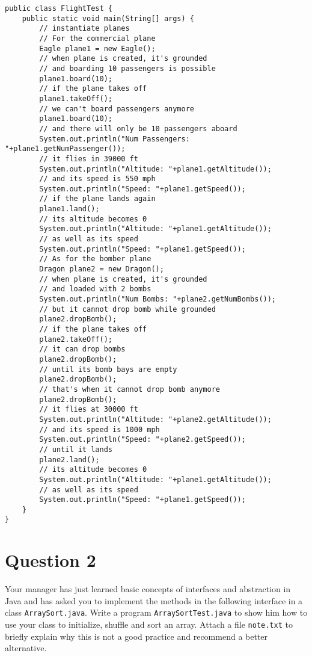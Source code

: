 \documentclass[12pt,letterpaper,twoside]{article}
\begin{document}
\begin{enumerate}
\lstset{language=java,tabsize=2}
\begin{lstlisting}
public class FlightTest {
	public static void main(String[] args) {
		// instantiate planes
		// For the commercial plane
		Eagle plane1 = new Eagle();
		// when plane is created, it's grounded
		// and boarding 10 passengers is possible
		plane1.board(10);
		// if the plane takes off
		plane1.takeOff();
		// we can't board passengers anymore
		plane1.board(10);
		// and there will only be 10 passengers aboard
		System.out.println("Num Passengers: "+plane1.getNumPassenger());
		// it flies in 39000 ft
		System.out.println("Altitude: "+plane1.getAltitude());
		// and its speed is 550 mph
		System.out.println("Speed: "+plane1.getSpeed());
		// if the plane lands again
		plane1.land();
		// its altitude becomes 0
		System.out.println("Altitude: "+plane1.getAltitude());
		// as well as its speed
		System.out.println("Speed: "+plane1.getSpeed());
		// As for the bomber plane
		Dragon plane2 = new Dragon();
		// when plane is created, it's grounded
		// and loaded with 2 bombs
		System.out.println("Num Bombs: "+plane2.getNumBombs());
		// but it cannot drop bomb while grounded
		plane2.dropBomb();
		// if the plane takes off
		plane2.takeOff();
		// it can drop bombs
		plane2.dropBomb();
		// until its bomb bays are empty
		plane2.dropBomb();
		// that's when it cannot drop bomb anymore
		plane2.dropBomb();
		// it flies at 30000 ft
		System.out.println("Altitude: "+plane2.getAltitude());
		// and its speed is 1000 mph
		System.out.println("Speed: "+plane2.getSpeed());
		// until it lands
		plane2.land();
		// its altitude becomes 0
		System.out.println("Altitude: "+plane1.getAltitude());
		// as well as its speed
		System.out.println("Speed: "+plane1.getSpeed());
	}
}
\end{lstlisting}

\end{enumerate}

\section*{Question 2}

Your manager has just learned basic concepts of interfaces and abstraction in Java and has asked you to implement the methods in the following interface in a class \texttt{ArraySort.java}. Write a program \texttt{ArraySortTest.java} to show him how to use your class to initialize, shuffle and sort an array. Attach a file \texttt{note.txt} to briefly explain why this is not a good practice and recommend a better alternative.
\end{document}
